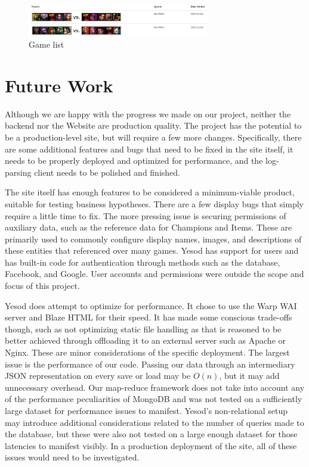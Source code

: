 \documentclass[letterpaper,twocolumn,9pt]{article}
\begin{document}
\begin{figure}[h]
    \includegraphics[width=80mm]{imgs/gamelist.png}
    \caption{Game list}
    \label{list}
\end{figure}

\section{Future Work}
\label{future}

Although we are happy with the progress we made on our project, neither the backend nor the Website are production quality.   The project has the potential to be a production-level site, but will require a few more changes.  Specifically, there are some additional features and bugs that need to be fixed in the site itself, it needs to be properly deployed and optimized for performance, and the log-parsing client needs to be polished and finished.

The site itself has enough features to be considered a minimum-viable product, suitable for testing business hypotheses.  There are a few display bugs that simply require a little time to fix.  The more pressing issue is securing permissions of auxiliary data, such as the reference data for Champions and Items.  These are primarily used to commonly configure display names, images, and descriptions of these entities that referenced over many games.  Yesod has support for users and has built-in code for authentication through methods such as the database, Facebook, and Google.  User accounts and permissions were outside the scope and focus of this project.

Yesod does attempt to optimize for performance.  It chose to use the Warp WAI server and Blaze HTML for their speed.  It has made some conscious trade-offs though, such as not optimizing static file handling as that is reasoned to be better achieved through offloading it to an external server such as Apache or Nginx.  These are minor considerations of the specific deployment.  The largest issue is the performance of our code.  Passing our data through an intermediary JSON representation on every save or load may be $O(n)$, but it may add unnecessary overhead.  Our map-reduce framework does not take into account any of the performance peculiarities of MongoDB and was not tested on a sufficiently large dataset for performance issues to manifest.  Yesod's non-relational setup may introduce additional considerations related to the number of queries made to the database, but these were also not tested on a large enough dataset for those latencies to manifest visibly.  In a production deployment of the site, all of these issues would need to be investigated.
\end{document}
